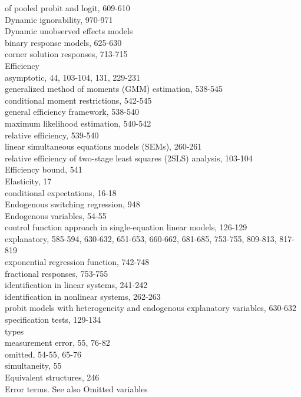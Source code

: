 \documentclass[10pt]{article}
\begin{document}
of pooled probit and logit, 609-610\\
Dynamic ignorability, 970-971\\
Dynamic unobserved effects models\\
binary response models, 625-630\\
corner solution responses, 713-715\\
Efficiency\\
asymptotic, 44, 103-104, 131, 229-231\\
generalized method of moments (GMM) estimation, 538-545\\
conditional moment restrictions, 542-545\\
general efficiency framework, 538-540\\
maximum likelihood estimation, 540-542\\
relative efficiency, 539-540\\
linear simultaneous equations models (SEMs), 260-261\\
relative efficiency of two-stage least squares (2SLS) analysis, 103-104\\
Efficiency bound, 541\\
Elasticity, 17\\
conditional expectations, 16-18\\
Endogenous switching regression, 948\\
Endogenous variables, 54-55\\
control function approach in single-equation linear models, 126-129\\
explanatory, 585-594, 630-632, 651-653, 660-662, 681-685, 753-755, 809-813, 817-819\\
exponential regression function, 742-748\\
fractional responses, 753-755\\
identification in linear systems, 241-242\\
identification in nonlinear systems, 262-263\\
probit models with heterogeneity and endogenous explanatory variables, 630-632\\
specification tests, 129-134\\
types\\
measurement error, 55, 76-82\\
omitted, 54-55, 65-76\\
simultaneity, 55\\
Equivalent structures, 246\\
Error terms. See also Omitted variables\\
\end{document}

